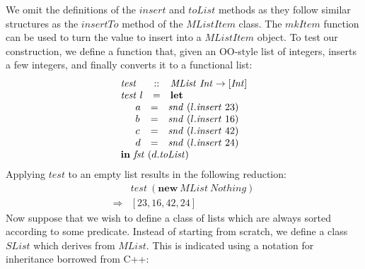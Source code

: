 \documentclass[runningheads,a4paper]{llncs}
\begin{document}
We omit the definitions of the $\mathit{insert}$ and $\mathit{toList}$ methods as they follow similar structures as the $\mathit{insertTo}$ method of the $\mathit{MListItem}$ class. The $\mathit{mkItem}$ function can be used to turn the value to insert into a $\mathit{MListItem}$ object. To test our construction, we define a function that, given an OO-style list of integers, inserts a few integers, and finally converts it to a functional list:
\begin{displaymath}
\begin{array}{lcl}
\mathit{test} & :: & \mathit{MList}~\mathit{Int} \to [\mathit{Int}]\\
\mathit{test}~l & = & \mathbf{let} \\
\multicolumn{3}{l}{\quad \begin{array}{lcl}
a & = & \mathit{snd}~(l.\mathit{insert}~23)\\
b & = & \mathit{snd}~(l.\mathit{insert}~16)\\
c & = & \mathit{snd}~(l.\mathit{insert}~42)\\
d & = & \mathit{snd}~(l.\mathit{insert}~24)\\
\end{array}}\\
\multicolumn{3}{l}{\mathbf{in}~\mathit{fst}~(d.\mathit{toList})}
\end{array}
\end{displaymath}
Applying $\mathit{test}$ to an empty list results in the following reduction:
\begin{displaymath}
\begin{array}{cl}
 & \mathit{test}~(\mathbf{new}~\mathit{MList}~\mathit{Nothing}) \\
\Rightarrow & [23,16,42,24]
\end{array}
\end{displaymath}
Now suppose that we wish to define a class of lists which are always sorted according to some predicate. Instead of starting from scratch, we define a class $\mathit{SList}$ which derives from $\mathit{MList}$. This is indicated using a notation for inheritance borrowed from C++:
\end{document}
